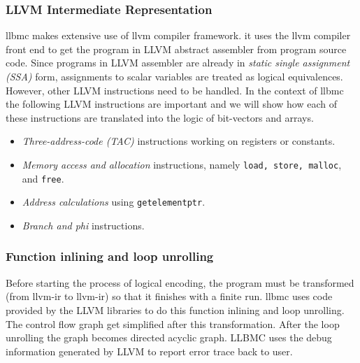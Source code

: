 \documentclass[14pt]{article}
\begin{document}
\subsubsection{LLVM Intermediate Representation}
llbmc makes extensive use of llvm compiler framework. it uses the llvm compiler front end to get the program in LLVM abstract assembler from program source code. Since programs in LLVM assembler are already in \textit{static single assignment (SSA)} form, assignments to scalar variables are treated as logical equivalences. However, other LLVM instructions need to be handled. 
In the context of llbmc the following LLVM instructions are important and we will show how each of these instructions are translated into the logic of bit-vectors and arrays. 
\begin{itemize}
  \item \textit{Three-address-code (TAC)} instructions working on registers or constants.
  \item \textit{Memory access and allocation} instructions, namely \texttt{load, store, malloc}, and \texttt{free}.
  \item \textit{Address calculations} using \texttt{getelementptr}.
  \item \textit{Branch and phi} instructions.
\end{itemize}

\subsubsection{Function inlining and loop unrolling} 
Before starting the process of logical encoding, the program must be transformed (from llvm-ir to llvm-ir) so that it finishes with a finite run. llbmc uses code provided by the LLVM libraries to do this function inlining and loop unrolling. The control flow graph get simplified after this transformation. After the loop unrolling the graph becomes directed acyclic graph. LLBMC uses the debug information generated by LLVM to report error trace back to user.
\end{document}
